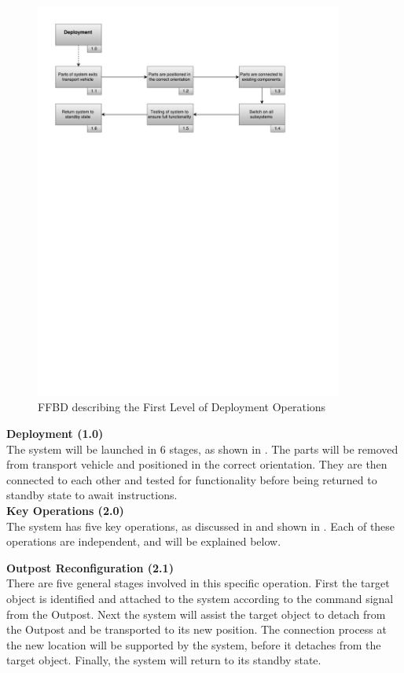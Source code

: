 \documentclass[12pt, letter]{article}
\begin{document}
\begin{figure}[H]
\centering
\includegraphics[width=0.9\textwidth]{deployment}
\caption{FFBD describing the First Level of Deployment Operations}
\label{deploy}
\end{figure}

\textbf{Deployment (1.0)}\\
The system will be launched in 6 stages, as shown in . The parts will be removed from transport vehicle and positioned in the correct orientation. They are then connected to each other and tested for functionality before being returned to standby state to await instructions.\\

\textbf{Key Operations (2.0)}\\
The system has five key operations, as discussed in  and shown in . Each of these operations are independent, and will be explained below.

\textbf{Outpost Reconfiguration (2.1)}\\
There are five general stages involved in this specific operation. First the target object is identified and attached to the system according to the command signal from the Outpost. Next the system will assist the target object to detach from the Outpost and be transported to its new position. The connection process at the new location will be supported by the system, before it detaches from the target object. Finally, the system will return to its standby state.
\end{document}
